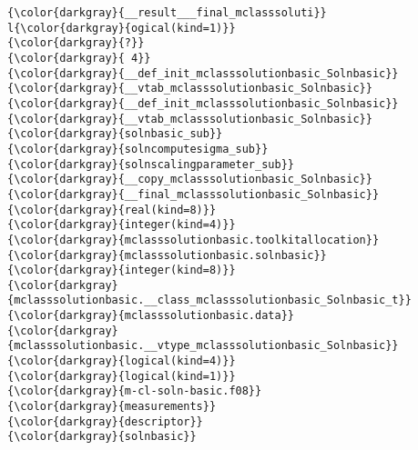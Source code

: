 {{\begin{Verbatim}[commandchars=\\\{\}]
{\color{darkgray}{__result___final_mclasssoluti}}
l{\color{darkgray}{ogical(kind=1)}}
{\color{darkgray}{?}}
{\color{darkgray}{ 4}}
{\color{darkgray}{__def_init_mclasssolutionbasic_Solnbasic}}
{\color{darkgray}{__vtab_mclasssolutionbasic_Solnbasic}}
{\color{darkgray}{__def_init_mclasssolutionbasic_Solnbasic}}
{\color{darkgray}{__vtab_mclasssolutionbasic_Solnbasic}}
{\color{darkgray}{solnbasic_sub}}
{\color{darkgray}{solncomputesigma_sub}}
{\color{darkgray}{solnscalingparameter_sub}}
{\color{darkgray}{__copy_mclasssolutionbasic_Solnbasic}}
{\color{darkgray}{__final_mclasssolutionbasic_Solnbasic}}
{\color{darkgray}{real(kind=8)}}
{\color{darkgray}{integer(kind=4)}}
{\color{darkgray}{mclasssolutionbasic.toolkitallocation}}
{\color{darkgray}{mclasssolutionbasic.solnbasic}}
{\color{darkgray}{integer(kind=8)}}
{\color{darkgray}{mclasssolutionbasic.__class_mclasssolutionbasic_Solnbasic_t}}
{\color{darkgray}{mclasssolutionbasic.data}}
{\color{darkgray}{mclasssolutionbasic.__vtype_mclasssolutionbasic_Solnbasic}}
{\color{darkgray}{logical(kind=4)}}
{\color{darkgray}{logical(kind=1)}}
{\color{darkgray}{m-cl-soln-basic.f08}}
{\color{darkgray}{measurements}}
{\color{darkgray}{descriptor}}
{\color{darkgray}{solnbasic}}
\end{Verbatim}
}}


\endinput  %
